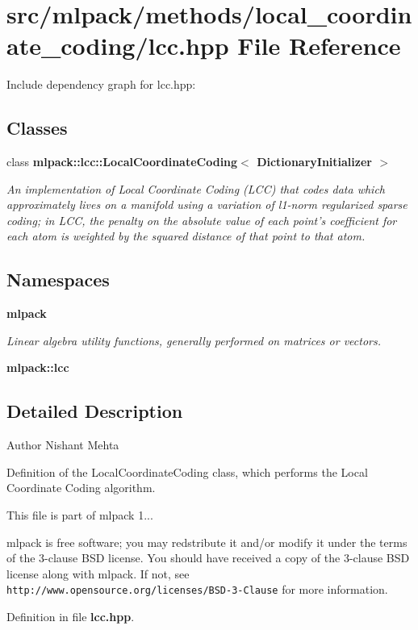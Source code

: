 \section{src/mlpack/methods/local\-\_\-coordinate\-\_\-coding/lcc.hpp File Reference}
\label{lcc_8hpp}
Include dependency graph for lcc.\-hpp\-:
\subsection*{Classes}
\begin{DoxyCompactItemize}
\item 
class {\bf mlpack\-::lcc\-::\-Local\-Coordinate\-Coding$<$ Dictionary\-Initializer $>$}
\begin{DoxyCompactList}\small\item\em An implementation of Local Coordinate Coding (L\-C\-C) that codes data which approximately lives on a manifold using a variation of l1-\/norm regularized sparse coding; in L\-C\-C, the penalty on the absolute value of each point's coefficient for each atom is weighted by the squared distance of that point to that atom. \end{DoxyCompactList}\end{DoxyCompactItemize}
\subsection*{Namespaces}
\begin{DoxyCompactItemize}
\item 
{\bf mlpack}
\begin{DoxyCompactList}\small\item\em Linear algebra utility functions, generally performed on matrices or vectors. \end{DoxyCompactList}\item 
{\bf mlpack\-::lcc}
\end{DoxyCompactItemize}


\subsection{Detailed Description}
\begin{DoxyAuthor}{Author}
Nishant Mehta
\end{DoxyAuthor}
Definition of the Local\-Coordinate\-Coding class, which performs the Local Coordinate Coding algorithm.

This file is part of mlpack 1...

mlpack is free software; you may redstribute it and/or modify it under the terms of the 3-\/clause B\-S\-D license. You should have received a copy of the 3-\/clause B\-S\-D license along with mlpack. If not, see {\tt http\-://www.\-opensource.\-org/licenses/\-B\-S\-D-\/3-\/\-Clause} for more information. 

Definition in file {\bf lcc.\-hpp}.

